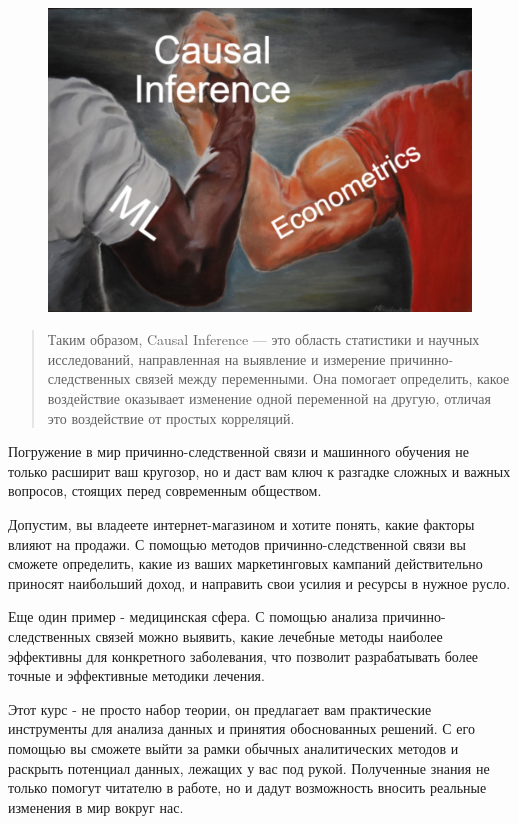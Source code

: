 \documentclass{article}
\begin{document}
        \begin{figure}[h]
            \centering
            \includegraphics[width=0.7\linewidth]{imgs/epic_CI.jpg}
            \label{fig:mpr}
        \end{figure}
        \newpage
        \begin{quote}
           Таким образом, Causal Inference — это область статистики и научных исследований, направленная на выявление и измерение причинно-следственных связей между переменными. Она помогает определить, какое воздействие оказывает изменение одной переменной на другую, отличая это воздействие от простых корреляций.
        \end{quote}

        Погружение в мир причинно-следственной связи и машинного обучения не только расширит ваш кругозор, но и даст вам ключ к разгадке сложных и важных вопросов, стоящих перед современным обществом.

        Допустим, вы владеете интернет-магазином и хотите понять, какие факторы влияют на продажи. С помощью методов причинно-следственной связи вы сможете определить, какие из ваших маркетинговых кампаний действительно приносят наибольший доход, и направить свои усилия и ресурсы в нужное русло.

        Еще один пример - медицинская сфера. С помощью анализа причинно-следственных связей можно выявить, какие лечебные методы наиболее эффективны для конкретного заболевания, что позволит разрабатывать более точные и эффективные методики лечения.

        Этот курс - не просто набор теории, он предлагает вам практические инструменты для анализа данных и принятия обоснованных решений. С его помощью вы сможете выйти за рамки обычных аналитических методов и раскрыть потенциал данных, лежащих у вас под рукой. Полученные знания не только помогут читателю в работе, но и дадут возможность вносить реальные изменения в мир вокруг нас.
\end{document}

